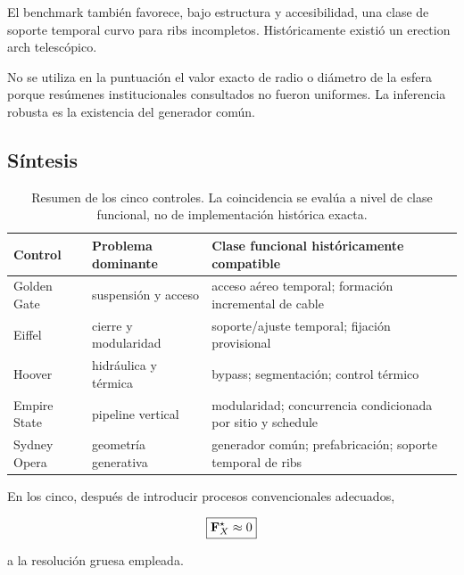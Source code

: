 El benchmark también favorece, bajo estructura y accesibilidad, una clase de soporte temporal curvo para ribs incompletos. Históricamente existió un erection arch telescópico.

No se utiliza en la puntuación el valor exacto de radio o diámetro de la esfera porque resúmenes institucionales consultados no fueron uniformes. La inferencia robusta es la existencia del generador común.

\subsection{Síntesis}

\begin{table}[ht]
\centering
\small
\begin{tabularx}{\textwidth}{lXX}
\toprule
Control & Problema dominante & Clase funcional históricamente compatible \\
\midrule
Golden Gate & suspensión y acceso & acceso aéreo temporal; formación incremental de cable \\
Eiffel & cierre y modularidad & soporte/ajuste temporal; fijación provisional \\
Hoover & hidráulica y térmica & bypass; segmentación; control térmico \\
Empire State & pipeline vertical & modularidad; concurrencia condicionada por sitio y schedule \\
Sydney Opera & geometría generativa & generador común; prefabricación; soporte temporal de ribs \\
\bottomrule
\end{tabularx}
\caption{Resumen de los cinco controles. La coincidencia se evalúa a nivel de clase funcional, no de implementación histórica exacta.}
\end{table}

En los cinco, después de introducir procesos convencionales adecuados,

\begin{equation}
\boxed{
\mathbf F_X^\star\approx0
}
\end{equation}

a la resolución gruesa empleada.
